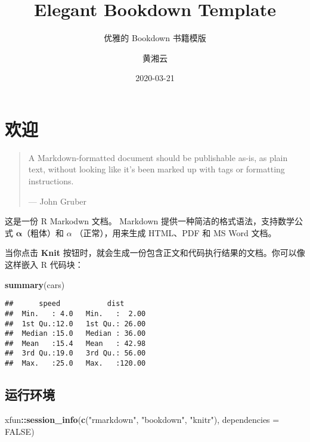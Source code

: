\documentclass[
  cn,11pt,chinese,bibstyle=apalike]{elegantbook}
\institute{Elegant\LaTeX{} Program}
\title{Elegant Bookdown Template}
\subtitle{优雅的 Bookdown 书籍模版}
\author{黄湘云}
\date{2020-03-21}
\newenvironment{Shaded}{\begin{snugshade}}{\end{snugshade}}
\newcommand{\DataTypeTok}[1]{\textcolor[rgb]{0.13,0.29,0.53}{#1}}
\newcommand{\KeywordTok}[1]{\textcolor[rgb]{0.13,0.29,0.53}{\textbf{#1}}}
\newcommand{\NormalTok}[1]{#1}
\newcommand{\OperatorTok}[1]{\textcolor[rgb]{0.81,0.36,0.00}{\textbf{#1}}}
\newcommand{\OtherTok}[1]{\textcolor[rgb]{0.56,0.35,0.01}{#1}}
\newcommand{\StringTok}[1]{\textcolor[rgb]{0.31,0.60,0.02}{#1}}
\begin{document}
\maketitle

{
\hypersetup{linkcolor=Maroon}
\setcounter{tocdepth}{2}
\tableofcontents
}
\listoftables
\listoffigures
\mainmatter

\hypertarget{welcome}{%
\chapter{欢迎}\label{welcome}}

\begin{quote}
A Markdown-formatted document should be publishable as-is, as plain text, without looking like it's been marked up with tags or formatting instructions.

\hspace*{\fill} --- John Gruber
\end{quote}

这是一份 R Markodwn 文档。 Markdown 提供一种简洁的格式语法，支持数学公式 \(\bm{\alpha}\)（粗体）和 \(\alpha\) （正常），用来生成 HTML、PDF 和 MS Word 文档。

当你点击 \textbf{Knit} 按钮时，就会生成一份包含正文和代码执行结果的文档。你可以像这样嵌入 R 代码块：

\begin{Shaded}
\begin{Highlighting}[]
\KeywordTok{summary}\NormalTok{(cars)}
\end{Highlighting}
\end{Shaded}

\begin{verbatim}
##      speed           dist       
##  Min.   : 4.0   Min.   :  2.00  
##  1st Qu.:12.0   1st Qu.: 26.00  
##  Median :15.0   Median : 36.00  
##  Mean   :15.4   Mean   : 42.98  
##  3rd Qu.:19.0   3rd Qu.: 56.00  
##  Max.   :25.0   Max.   :120.00
\end{verbatim}

\hypertarget{session-info}{%
\section{运行环境}\label{session-info}}

\begin{Shaded}
\begin{Highlighting}[]
\NormalTok{xfun}\OperatorTok{::}\KeywordTok{session\_info}\NormalTok{(}\KeywordTok{c}\NormalTok{(}\StringTok{"rmarkdown"}\NormalTok{, }\StringTok{"bookdown"}\NormalTok{, }\StringTok{"knitr"}\NormalTok{), }\DataTypeTok{dependencies =} \OtherTok{FALSE}\NormalTok{)}
\end{Highlighting}
\end{Shaded}
\end{document}
